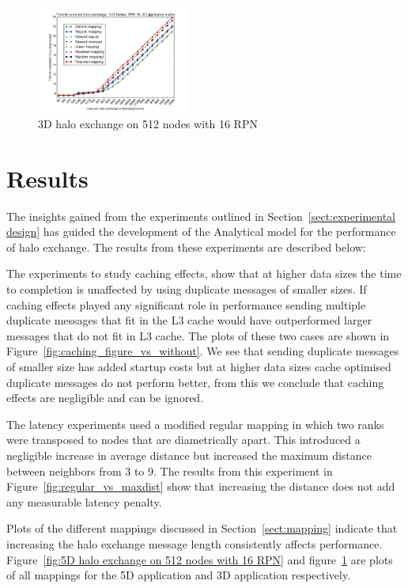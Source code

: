 \documentclass{acm_proc_article-sp}
\begin{document}
\begin{figure}
  \center
  \includegraphics[width=0.45\textwidth]{3D_512_all_mappings.png}
  \caption{3D halo exchange on 512 nodes with 16 RPN}
    \label{fig:3D halo exchange on 512 nodes with 16 RPN}
\end{figure}


\section{Results}


The insights gained from the experiments outlined in Section~\ref{sect:experimental design}
has guided the development of the Analytical model for the performance of halo exchange.
The results from these experiments are described below:

The experiments to study caching effects, show that at higher data sizes the time to completion
is unaffected by using duplicate messages of smaller sizes. If caching effects played any significant
role in performance sending multiple duplicate messages that fit in the L3 cache would have
outperformed larger messages that do not fit in L3 cache. The plots of these two cases are shown
in Figure~\ref{fig:caching_figure_vs_without}. We see that sending duplicate messages of smaller
size has added startup costs but at higher data sizes cache optimised  duplicate messages do not
perform better, from this we conclude that caching effects are negligible and can be ignored.

The latency experiments used a modified regular mapping in which two ranks were transposed to
nodes that are diametrically apart. This introduced a negligible increase in average distance but
increased the maximum distance between neighbors from 3 to 9. The results from this experiment
in Figure~\ref{fig:regular_vs_maxdist} show that increasing the distance does not add any measurable
latency penalty.

Plots of the different mappings discussed in Section~\ref{sect:mapping} indicate that increasing
the halo exchange message length consistently affects performance.
Figure~\ref{fig:5D halo exchange on 512 nodes with 16 RPN} and figure~\ref{fig:3D halo exchange on 512 nodes with 16 RPN}
are plots of all mappings for the 5D application and 3D application respectively.
\end{document}
